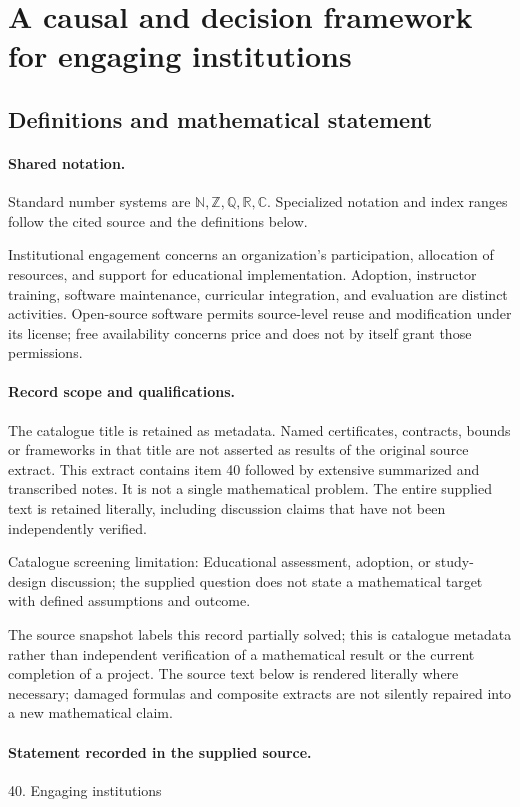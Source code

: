 \documentclass[11pt]{article}
\begin{document}
\section{A causal and decision framework for engaging institutions}\label{statement}

\subsection{Definitions and mathematical statement}

\paragraph{Shared notation.}Standard number systems are $\mathbb N,\mathbb Z,\mathbb Q,\mathbb R,\mathbb C$. Specialized notation and index ranges follow the cited source and the definitions below.


Institutional engagement concerns an organization's participation, allocation of resources, and support for educational implementation. Adoption, instructor training, software maintenance, curricular integration, and evaluation are distinct activities. Open-source software permits source-level reuse and modification under its license; free availability concerns price and does not by itself grant those permissions.
\paragraph{Record scope and qualifications.}
The catalogue title is retained as metadata. Named certificates, contracts, bounds or frameworks in that title are not asserted as results of the original source extract.
This extract contains item 40 followed by extensive summarized and transcribed notes. It is not a single mathematical problem. The entire supplied text is retained literally, including discussion claims that have not been independently verified.

Catalogue screening limitation: Educational assessment, adoption, or study-design discussion; the supplied question does not state a mathematical target with defined assumptions and outcome.

The source snapshot labels this record partially solved; this is catalogue metadata rather than independent verification of a mathematical result or the current completion of a project.
The source text below is rendered literally where necessary; damaged formulas and composite extracts are not silently repaired into a new mathematical claim.
\paragraph{Statement recorded in the supplied source.}
40. Engaging institutions
\end{document}
